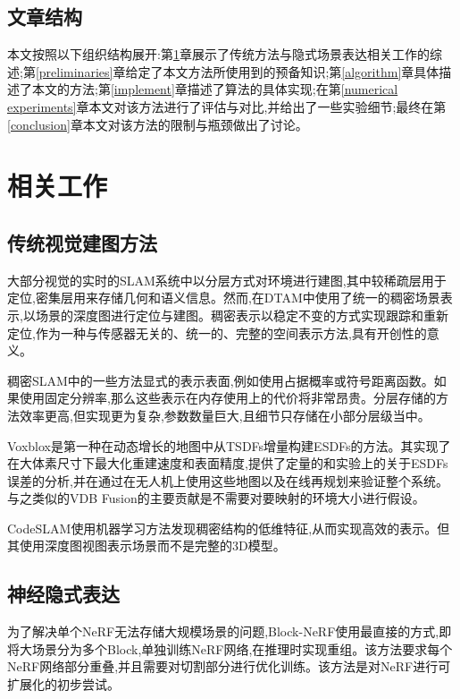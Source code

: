 \subsection{文章结构}
本文按照以下组织结构展开:第\ref{related work}章展示了传统方法与隐式场景表达相关工作的综述;第\ref{preliminaries}章给定了本文方法所使用到的预备知识;第\ref{algorithm}章具体描述了本文的方法;第\ref{implement}章描述了算法的具体实现;在第\ref{numerical experiments}章本文对该方法进行了评估与对比,并给出了一些实验细节;最终在第\ref{conclusion}章本文对该方法的限制与瓶颈做出了讨论。

\clearpage
\section{相关工作}\label{related work}

\subsection{传统视觉建图方法}
大部分视觉的实时的SLAM系统中以分层方式对环境进行建图,其中较稀疏层用于定位,密集层用来存储几何和语义信息。然而,在DTAM\cite{DTAM}中使用了统一的稠密场景表示,以场景的深度图进行定位与建图。稠密表示以稳定不变的方式实现跟踪和重新定位,作为一种与传感器无关的、统一的、完整的空间表示方法,具有开创性的意义。

稠密SLAM中的一些方法显式的表示表面,例如使用占据概率或符号距离函数。如果使用固定分辨率\cite{tradition1},那么这些表示在内存使用上的代价将非常昂贵。分层存储\cite{tradition2}的方法效率更高,但实现更为复杂,参数数量巨大,且细节只存储在小部分层级当中。

Voxblox\cite{voxblox}是第一种在动态增长的地图中从TSDFs增量构建ESDFs的方法。其实现了在大体素尺寸下最大化重建速度和表面精度,提供了定量的和实验上的关于ESDFs误差的分析,并在通过在无人机上使用这些地图以及在线再规划来验证整个系统。与之类似的VDB Fusion\cite{vdbfusion}的主要贡献是不需要对要映射的环境大小进行假设。

CodeSLAM\cite{CodeSLAM}使用机器学习方法发现稠密结构的低维特征,从而实现高效的表示。但其使用深度图视图表示场景而不是完整的3D模型。
\subsection{神经隐式表达}
为了解决单个NeRF无法存储大规模场景的问题,Block-NeRF\cite{block}使用最直接的方式,即将大场景分为多个Block,单独训练NeRF网络,在推理时实现重组。该方法要求每个NeRF网络部分重叠,并且需要对切割部分进行优化训练。该方法是对NeRF进行可扩展化的初步尝试。

